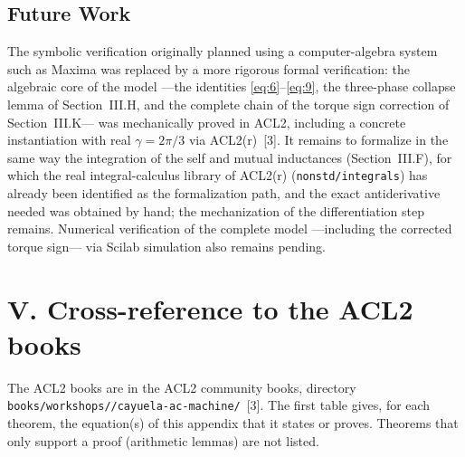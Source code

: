 \documentclass[11pt,a4paper]{article}
\begin{document}
\subsection*{Future Work}

The symbolic verification originally planned using a computer-algebra system such as Maxima was replaced by a more rigorous formal verification: the algebraic core of the model ---the identities \eqref{eq:6}--\eqref{eq:9}, the three-phase collapse lemma of Section~III.H, and the complete chain of the torque sign correction of Section~III.K--- was mechanically proved in ACL2, including a concrete instantiation with real $\gamma=2\pi/3$ via ACL2(r)~[3]. It remains to formalize in the same way the integration of the self and mutual inductances (Section~III.F), for which the real integral-calculus library of ACL2(r) (\texttt{nonstd/integrals}) has already been identified as the formalization path, and the exact antiderivative needed was obtained by hand; the mechanization of the differentiation step remains. Numerical verification of the complete model ---including the corrected torque sign--- via Scilab simulation also remains pending.

\section*{V. Cross-reference to the ACL2 books}

The ACL2 books are in the ACL2 community books, directory \texttt{books/\allowbreak workshops//\allowbreak cayuela-\allowbreak ac-\allowbreak machine/}~[3]. The first table gives, for each theorem, the equation(s) of this appendix that it states or proves. Theorems that only support a proof (arithmetic lemmas) are not listed.
\end{document}
